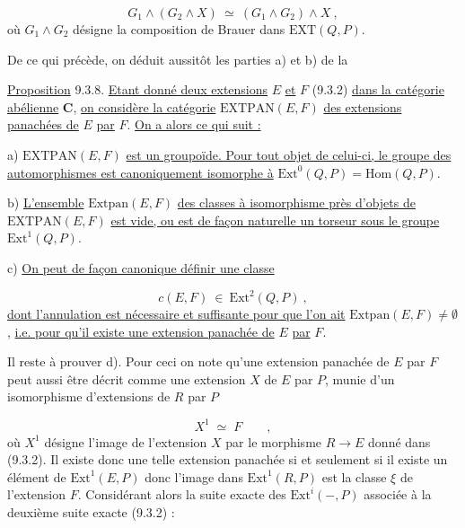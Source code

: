 \begin{equation}\tag{9.3.7}
G_1 \wedge (G_2 \wedge X) \ \simeq \ (G_1 \wedge G_2) \wedge X \ ,
\end{equation}
où $G_1 \wedge G_2$ désigne la composition de Brauer dans $\mathrm{EXT}(Q,P)$.

De ce qui précède, on déduit aussitôt les parties a) et b) de la

\underline{Proposition} 9.3.8. \underline{Etant donné deux extensions} $E$ \underline{et} $F$ (9.3.2) \underline{dans la catégorie abélienne} $\mathbf{C}$, \underline{on considère la catégorie} $\mathrm{EXTPAN}(E,F)$ \underline{des extensions panachées de} $E$ \underline{par} $F$. \underline{On a alors ce qui suit :}

a) $\mathrm{EXTPAN}(E,F)$ \underline{est un groupoïde. Pour tout objet de celui-ci, le groupe des automorphismes est canoniquement isomorphe à} $\mathrm{Ext}^{0}(Q,P) = \mathrm{Hom}(Q,P)$.

b) \underline{L'ensemble} $\mathrm{Extpan}(E,F)$ \underline{des classes à isomorphisme près d'objets de} $\mathrm{EXTPAN}(E,F)$ \underline{est vide, ou est de façon naturelle un torseur sous le groupe} $\mathrm{Ext}^{1}(Q,P)$.

c) \underline{On peut de façon canonique définir une classe}

\begin{equation}\tag{9.3.9}
c(E,F) \ \in \ \mathrm{Ext}^{2}(Q,P) \ ,
\end{equation}
\underline{dont l'annulation est nécessaire et suffisante pour que l'on ait} $\mathrm{Extpan}(E,F) \neq \emptyset$ , \underline{i.e. pour qu'il existe une extension panachée de} $E$ \underline{par} $F$.



Il reste à prouver d). Pour ceci on note qu'une extension panachée de $E$ par $F$ peut aussi être décrit comme une extension $X$ de $E$ par $P$, munie d'un isomorphisme d'extensions de $R$ par $P$

\begin{equation*}
X^1 \;\simeq\; F \qquad ,
\end{equation*}
où $X^1$ désigne l'image de l'extension $X$ par le morphisme $R \longrightarrow E$ donné dans (9.3.2). Il existe donc une telle extension panachée si et seulement si il existe un élément de $\mathrm{Ext}^1(E,P)$ donc l'image dans $\mathrm{Ext}^1(R,P)$ est la classe $\xi$ de l'extension $F$. Considérant alors la suite exacte des $\mathrm{Ext}^i( - ,P)$ associée à la deuxième suite exacte (9.3.2) :

